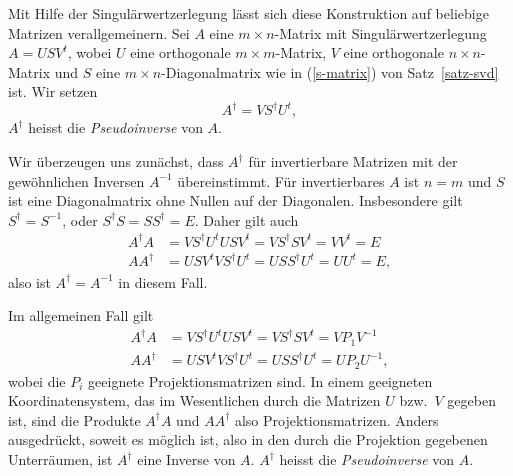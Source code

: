 Mit Hilfe der Singulärwertzerlegung lässt sich diese Konstruktion
auf beliebige Matrizen verallgemeinern.
Sei $A$ eine $m\times n$-Matrix mit Singulärwertzerlegung
$A=USV^t$, wobei $U$ eine orthogonale $m\times m$-Matrix, $V$ eine orthogonale
$n\times n$-Matrix und $S$ eine $m\times n$-Diagonalmatrix wie in (\ref{s-matrix})
von Satz~\ref{satz-svd} ist.
Wir setzen
\begin{equation}
A^\dagger = VS^\dagger U^t,
\label{definition-pseudoinverse}
\end{equation}
$A^\dagger$ heisst die {\em Pseudoinverse} von $A$.

Wir überzeugen uns zunächst, dass $A^\dagger$ für invertierbare Matrizen
mit der gewöhnlichen Inversen $A^{-1}$ übereinstimmt.
Für invertierbares $A$ ist $n=m$ und $S$ ist eine Diagonalmatrix ohne Nullen
auf der Diagonalen.
Insbesondere gilt $S^\dagger=S^{-1}$, oder $S^\dagger S=SS^\dagger=E$.
Daher gilt auch
\begin{align*}
A^\dagger A&=VS^\dagger U^tUSV^t=VS^\dagger SV^t=VV^t=E\\
AA^\dagger &=USV^tVS^\dagger U^t=USS^\dagger U^t=UU^t=E,
\end{align*}
also ist $A^\dagger=A^{-1}$ in diesem Fall.

Im allgemeinen Fall gilt
\begin{align*}
A^\dagger A&=VS^\dagger U^tUSV^t=VS^\dagger SV^t=VP_1V^{-1}\\
AA^\dagger &=USV^tVS^\dagger U^t=USS^\dagger U^t=UP_2U^{-1},
\end{align*}
wobei die $P_i$ geeignete Projektionsmatrizen sind.
In einem geeigneten Koordinatensystem, das im Wesentlichen durch die Matrizen
$U$ bzw.~$V$ gegeben ist, sind die Produkte $A^\dagger A$ und $AA^\dagger$
also Projektionsmatrizen.
Anders ausgedrückt, soweit es möglich ist, also in den durch die Projektion
gegebenen Unterräumen, ist $A^\dagger$ eine Inverse von $A$.
$A^\dagger$ heisst die {\em Pseudoinverse} von $A$.

